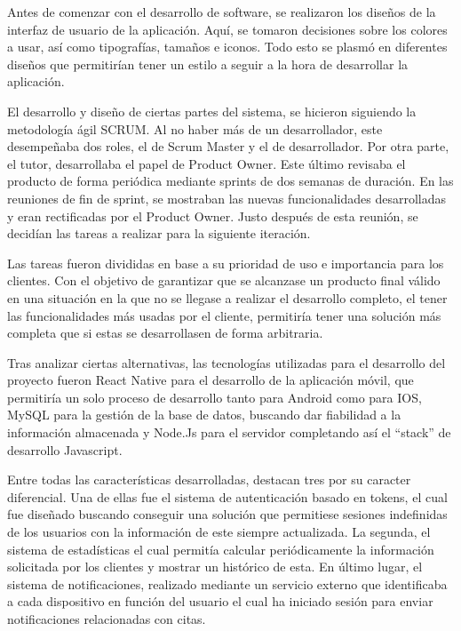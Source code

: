 Antes de comenzar con el desarrollo de software, se realizaron los diseños de la interfaz de usuario de la aplicación. Aquí, se tomaron decisiones sobre los colores a usar, así como tipografías, tamaños e iconos. Todo esto se plasmó en diferentes diseños que permitirían tener un estilo a seguir a la hora de desarrollar la aplicación. 

El desarrollo y diseño de ciertas partes del sistema, se hicieron siguiendo la metodología ágil SCRUM. Al no haber más de un desarrollador, este desempeñaba dos roles, el de Scrum Master y el de desarrollador. Por otra parte, el tutor, desarrollaba el papel de Product Owner. Este último revisaba el producto de forma periódica mediante sprints de dos semanas de duración. En las reuniones de fin de sprint, se mostraban las nuevas funcionalidades desarrolladas y eran rectificadas por el Product Owner. Justo después de esta reunión, se decidían las tareas a realizar para la siguiente iteración. 

Las tareas fueron divididas en base a su prioridad de uso e importancia para los clientes. Con el objetivo de garantizar que se alcanzase un producto final válido en una situación en la que no se llegase a realizar el desarrollo completo, el tener las funcionalidades más usadas por el cliente, permitiría tener una solución más completa que si estas se desarrollasen de forma arbitraria.

Tras analizar ciertas alternativas, las tecnologías utilizadas para el desarrollo del proyecto fueron React Native para el desarrollo de la aplicación móvil, que permitiría un solo proceso de desarrollo tanto para Android como para IOS, MySQL para la gestión de la base de datos, buscando dar fiabilidad a la información almacenada y Node.Js para el servidor completando así el ``stack'' de desarrollo Javascript.

Entre todas las características desarrolladas, destacan tres por su caracter diferencial. Una de ellas fue el sistema de autenticación basado en tokens, el cual fue diseñado buscando conseguir una solución que permitiese sesiones indefinidas de los usuarios con la información de este siempre actualizada. La segunda, el sistema de estadísticas el cual permitía calcular periódicamente la información solicitada por los clientes y mostrar un histórico de esta. En último lugar, el sistema de notificaciones, realizado mediante un servicio externo que identificaba a cada dispositivo en función del usuario el cual ha iniciado sesión para enviar notificaciones relacionadas con citas.

